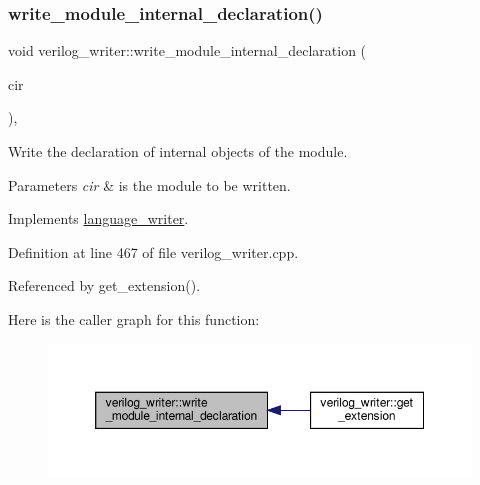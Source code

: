 \subsubsection{\texorpdfstring{write\+\_\+module\+\_\+internal\+\_\+declaration()}{write\_module\_internal\_declaration()}}
{\footnotesize\ttfamily void verilog\+\_\+writer\+::write\+\_\+module\+\_\+internal\+\_\+declaration (\begin{DoxyParamCaption}\item[{const \hyperlink{structural__objects_8hpp_a8ea5f8cc50ab8f4c31e2751074ff60b2}{structural\+\_\+object\+Ref} \&}]{cir }\end{DoxyParamCaption})\hspace{0.3cm}{\ttfamily [override]}, {\ttfamily [virtual]}}



Write the declaration of internal objects of the module. 


\begin{DoxyParams}{Parameters}
{\em cir} & is the module to be written. \\
\hline
\end{DoxyParams}


Implements \hyperlink{classlanguage__writer_a3971d4b51e6c1762c29f8e0cb0a899f7}{language\+\_\+writer}.



Definition at line 467 of file verilog\+\_\+writer.\+cpp.



Referenced by get\+\_\+extension().

Here is the caller graph for this function\+:
\nopagebreak
\begin{figure}[H]
\begin{center}
\leavevmode
\includegraphics[width=350pt]{d8/dba/classverilog__writer_a7384e2a4f2485bcadb61747e2371f64e_icgraph}
\end{center}
\end{figure}
\mbox{\label{classverilog__writer_aa097c810dcf1d52f5559ad89def6da17}} 
